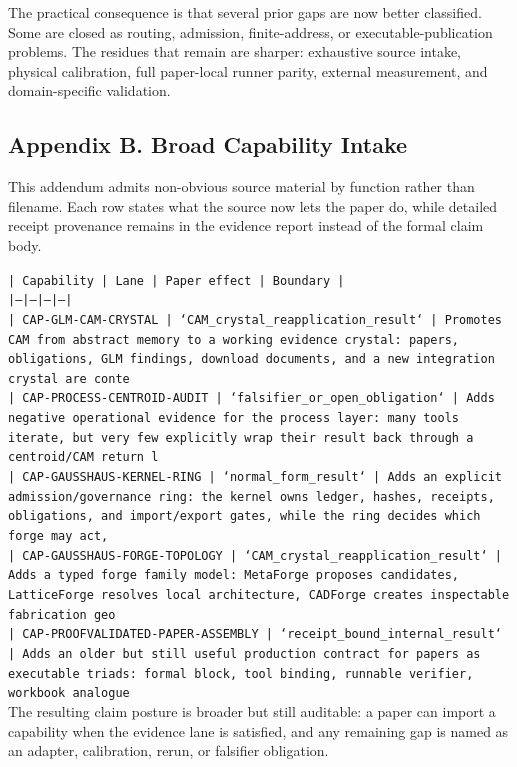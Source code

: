 \documentclass[11pt]{article}
\begin{document}
The practical consequence is that several prior gaps are now better classified. Some are closed as routing, admission, finite-address, or executable-publication problems. The residues that remain are sharper: exhaustive source intake, physical calibration, full paper-local runner parity, external measurement, and domain-specific validation.

\subsection*{Appendix B. Broad Capability Intake}

This addendum admits non-obvious source material by function rather than filename. Each row states what the source now lets the paper do, while detailed receipt provenance remains in the evidence report instead of the formal claim body.

\noindent\texttt{| Capability | Lane | Paper effect | Boundary |}\\
\noindent\texttt{|---|---|---|---|}\\
\noindent\texttt{| CAP-GLM-CAM-CRYSTAL | `CAM\_crystal\_reapplication\_result` | Promotes CAM from abstract memory to a working evidence crystal: papers, obligations, GLM findings, download documents, and a new integration crystal are conte}\\
\noindent\texttt{| CAP-PROCESS-CENTROID-AUDIT | `falsifier\_or\_open\_obligation` | Adds negative operational evidence for the process layer: many tools iterate, but very few explicitly wrap their result back through a centroid/CAM return l}\\
\noindent\texttt{| CAP-GAUSSHAUS-KERNEL-RING | `normal\_form\_result` | Adds an explicit admission/governance ring: the kernel owns ledger, hashes, receipts, obligations, and import/export gates, while the ring decides which forge may act,}\\
\noindent\texttt{| CAP-GAUSSHAUS-FORGE-TOPOLOGY | `CAM\_crystal\_reapplication\_result` | Adds a typed forge family model: MetaForge proposes candidates, LatticeForge resolves local architecture, CADForge creates inspectable fabrication geo}\\
\noindent\texttt{| CAP-PROOFVALIDATED-PAPER-ASSEMBLY | `receipt\_bound\_internal\_result` | Adds an older but still useful production contract for papers as executable triads: formal block, tool binding, runnable verifier, workbook analogue}\\

The resulting claim posture is broader but still auditable: a paper can import a capability when the evidence lane is satisfied, and any remaining gap is named as an adapter, calibration, rerun, or falsifier obligation.
\end{document}
